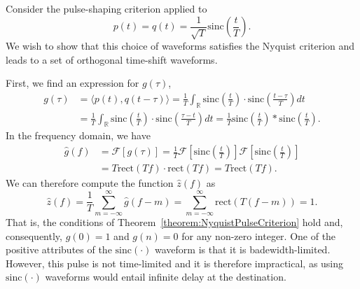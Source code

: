 \begin{example}
Consider the pulse-shaping criterion applied to
\begin{equation*}
p(t) = q(t) = \frac{1}{\sqrt{T}} \mathrm{sinc} \left( \frac{t}{T} \right) .
\end{equation*}
We wish to show that this choice of waveforms satisfies the Nyquist criterion and leads to a set of orthogonal time-shift waveforms.

First, we find an expression for $g(\tau)$,
\begin{equation*}
\begin{split}
g(\tau) &= \langle p(t), q(t-\tau) \rangle
= \frac{1}{T} \int_{\mathbb{R}} \mathrm{sinc} \left( \frac{t}{T} \right)
\cdot \mathrm{sinc} \left( \frac{t - \tau}{T} \right) dt \\
&= \frac{1}{T} \int_{\mathbb{R}} \mathrm{sinc} \left( \frac{t}{T} \right)
\cdot \mathrm{sinc} \left( \frac{\tau - t}{T} \right) dt
= \frac{1}{T} \mathrm{sinc} \left( \frac{t}{T} \right)
\ast \mathrm{sinc} \left( \frac{t}{T} \right) .
\end{split}
\end{equation*}
In the frequency domain, we have
\begin{equation*}
\begin{split}
\hat{g}(f) &= \mathcal{F} \left[ g(\tau) \right]
= \frac{1}{T} \mathcal{F} \left[ \mathrm{sinc} \left( \frac{t}{T} \right) \right]
\mathcal{F} \left[ \mathrm{sinc} \left( \frac{t}{T} \right) \right] \\
&= T \mathrm{rect} (T f) \cdot \mathrm{rect} (T f)
= T \mathrm{rect} (T f) .
\end{split}
\end{equation*}
We can therefore compute the function $\hat{z}(f)$ as
\begin{equation*}
\hat{z} (f) = \frac{1}{T} \sum_{m = -\infty}^{\infty} \hat{g}(f-m)
= \sum_{m = - \infty}^{\infty} \mathrm{rect} (T(f-m))
= 1 .
\end{equation*}
That is, the conditions of Theorem~\ref{theorem:NyquistPulseCriterion} hold and, consequently, $g(0) = 1$ and $g(n) = 0$ for any non-zero integer.
One of the positive attributes of the $\mathrm{sinc} (\cdot)$ waveform is that it is badewidth-limited.
However, this pulse is not time-limited and it is therefore impractical, as using $\mathrm{sinc} (\cdot)$ waveforms would entail infinite delay at the destination.
\end{example}

\newpage

